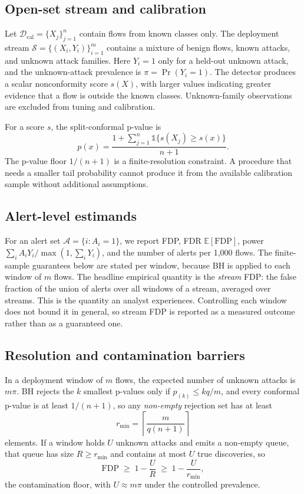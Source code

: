 \documentclass[a4paper,fleqn]{cas-dc}
\newcommand{\FDP}{\mathrm{FDP}}
\begin{document}
\subsection{Open-set stream and calibration}
Let $\mathcal{D}_{\mathrm{cal}}=\{X_j\}_{j=1}^{n}$ contain flows from known classes only. The deployment stream $\mathcal{S}=\{(X_i,Y_i)\}_{i=1}^{m}$ contains a mixture of benign flows, known attacks, and unknown attack families. Here $Y_i=1$ only for a held-out unknown attack, and the unknown-attack prevalence is $\pi=\Pr(Y_i=1)$. The detector produces a scalar nonconformity score $s(X)$, with larger values indicating greater evidence that a flow is outside the known classes. Unknown-family observations are excluded from tuning and calibration.

For a score $s$, the split-conformal p-value is
\begin{equation}
 p(x)=\frac{1+\sum_{j=1}^{n}\mathbb{1}\{s(X_j)\ge s(x)\}}{n+1}.
\end{equation}
The p-value floor $1/(n+1)$ is a finite-resolution constraint. A procedure that needs a smaller tail probability cannot produce it from the available calibration sample without additional assumptions.

\subsection{Alert-level estimands}
For an alert set $\mathcal{A}=\{i:A_i=1\}$, we report FDP, FDR $\mathbb{E}[\FDP]$, power $\sum_i A_iY_i/\max(1,\sum_iY_i)$, and the number of alerts per 1,000 flows. The finite-sample guarantees below are stated per window, because BH is applied to each window of $m$ flows. The headline empirical quantity is the \emph{stream} FDP: the false fraction of the union of alerts over all windows of a stream, averaged over streams. This is the quantity an analyst experiences. Controlling each window does not bound it in general, so stream FDP is reported as a measured outcome rather than as a guaranteed one.

\subsection{Resolution and contamination barriers}
In a deployment window of $m$ flows, the expected number of unknown attacks is $m\pi$. BH rejects the $k$ smallest p-values only if $p_{(k)}\le kq/m$, and every conformal p-value is at least $1/(n+1)$, so any \emph{non-empty} rejection set has at least
\begin{equation}
 r_{\min}=\left\lceil \frac{m}{q(n+1)}\right\rceil
 \label{eq:rmin}
\end{equation}
elements. If a window holds $U$ unknown attacks and emits a non-empty queue, that queue has size $R\ge r_{\min}$ and contains at most $U$ true discoveries, so
\begin{equation}
 \FDP \;\geq\; 1-\frac{U}{R} \;\geq\; 1-\frac{U}{r_{\min}},
\label{eq:contam}
\end{equation}
the contamination floor, with $U\approx m\pi$ under the controlled prevalence.
\end{document}
